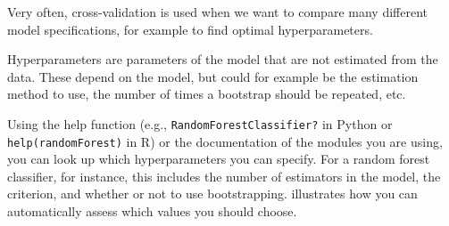 Very often, cross-validation is used when we want to compare many
different model specifications, for example to find optimal
hyperparameters.

Hyperparameters are parameters of the model that are not estimated
from the data. These depend on the model, but could for example be the
estimation method to use, the number of times a bootstrap should be
repeated, etc.

Using the help function (e.g., \verb+RandomForestClassifier?+ in
Python or \verb+help(randomForest)+ in R) or the documentation of the
modules you are using, you can look up which hyperparameters you can
specify. For a random forest classifier, for instance, this includes
the number of estimators in the model, the criterion, and whether or
not to use bootstrapping.  illustrates how you can automatically assess which values you should choose.




